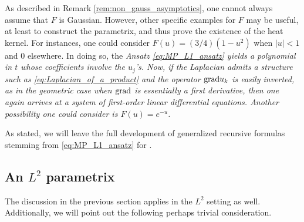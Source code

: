 \documentclass[11pt,reqno]{amsart}
\theoremstyle{remark}
\theoremstyle{definition}
\numberwithin{theorem}{section} \numberwithin{equation}{section}
\begin{document}
As described in Remark \ref{rem:non_gauss_asymptotics}, one cannot always assume that $F$ is Gaussian.
However, other specific examples for $F$ may be useful, at least to construct the parametrix, and thus prove the existence of the heat kernel.
For instances, one could consider $F(u) = (3/4)(1 - u^{2})$ when $\vert u \vert < 1$ and $0$ elsewhere.  In doing so, the
\it Ansatz \rm \ref{eq:MP_L1_ansatz} yields a polynomial in $t$ whose coefficients involve the $u_{j}$'s. Now, if the Laplacian
admits a structure such as \eqref{eq:Laplacian_of_a_product} and the operator $\text{\rm grad} u_{k}$ is easily inverted, as in the
geometric case when $\text{\rm grad} $ is essentially a first derivative, then one again arrives at a system of first-order linear
differential equations.  Another possibility one could consider is $F(u) = e^{-u}$.

As stated, we will leave the full development of generalized recursive formulas stemming from \eqref{eq:MP_L1_ansatz} for \cite{JJS26}.


\subsection{An $L^2$ parametrix} The discussion in the previous section applies in the $L^2$ setting as well.  Additionally,
we will point out the following perhaps trivial consideration.
\end{document}
